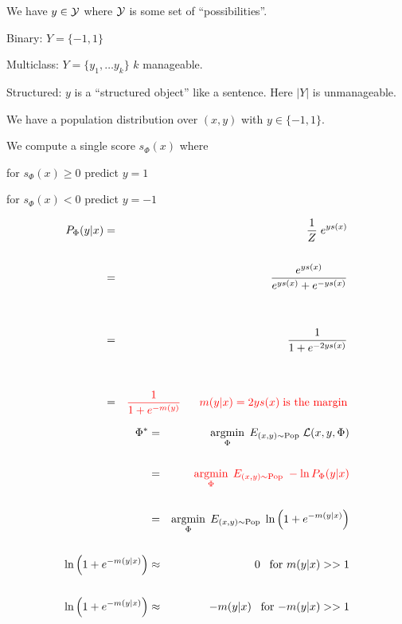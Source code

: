 {

We have {\color{red} $y \in {\cal Y}$} where {\color{red} ${\cal Y}$} is some set of ``possibilities''.

\vfill
Binary: {\color{red} $Y = \{-1,1\}$}

\vfill
Multiclass: {\color{red} $Y = \{y_1,\ldots y_k\}$} $k$ manageable.

\vfill
Structured: {\color{red} $y$} is a ``structured object'' like a sentence.  Here {\color{red} $|Y|$} is unmanageable.


We have a population distribution over $(x,y)$ with $y \in \{-1,1\}$.

\vfill
We compute a single score $s_\Phi(x)$ where

\vfill
for $s_\Phi(x) \geq 0$ predict $y = 1$

\vfill
for $s_\Phi(x) < 0$ predict $y = -1$


\begin{eqnarray*}
  P_\Phi(y|x) & = & \frac{1}{Z} \;e^{ys(x)} \\
  \\
  & = & \frac{e^{ys(x)}}{e^{ys(x)} + e^{-ys(x)}} \\
  \\
  \\
  & = & \frac{1}{1 + e^{-2ys(x)}} \\
  \\
  \\
    & = & {\color{red} \frac{1}{1 + e^{-m(y)}} \;\;\;\;\;\;m(y|x) = 2ys(x)\;\mbox{is the margin}}
\end{eqnarray*}


\begin{eqnarray*}
  \Phi^* & = & \operatorname*{argmin}_\Phi\;E_{(x,y) \sim \mathrm{Pop}}\;{\cal L}(x,y,\Phi) \\
  \\
  & = & {\color{red} \operatorname*{argmin}_\Phi\;E_{(x,y) \sim \mathrm{Pop}}\;-\ln P_\Phi(y|x)} \\
  \\
  & = & \operatorname*{argmin}_\Phi\;E_{(x,y) \sim \mathrm{Pop}}\;\ln \left(1 + e^{-m(y|x)}\right) \\
  \\
  \ln \left(1 + e^{-m(y|x)}\right) & \approx & 0 \;\;\;\mbox{for $m(y|x) >> 1$} \\
  \\
  \ln \left(1 + e^{-m(y|x)}\right) & \approx & -m(y|x) \;\;\;\mbox{for $-m(y|x) >> 1$} \\
\end{eqnarray*}

}
